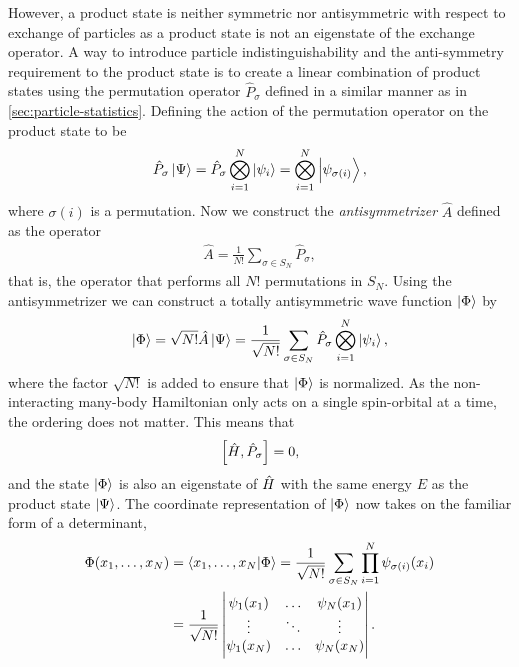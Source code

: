         However, a product state is neither symmetric nor antisymmetric with
        respect to exchange of particles as a product state is not an eigenstate
        of the exchange operator.
        A way to introduce particle indistinguishability and the anti-symmetry
        requirement to the product state is to create a linear combination of
        product states using the permutation operator $\hat{P}_{\sigma}$ defined
        in a similar manner as in \autoref{sec:particle-statistics}.
        Defining the action of the permutation operator on the product state to
        be
        \begin{align}
            \hat{P}_{\sigma}\ket{\Psi}
            = \hat{P}_{\sigma}\bigotimes_{i = 1}^{N}\ket{\psi_i}
            = \bigotimes_{i = 1}^{N}\ket{\psi_{\sigma(i)}},
        \end{align}
        where $\sigma(i)$ is a permutation.
        Now we construct the \emph{antisymmetrizer} $\hat{A}$ defined as the
        operator
        \begin{align}
            \hat{A} = \frac{1}{N!}\sum_{\sigma \in S_{N}}\hat{P}_{\sigma},
        \end{align}
        that is, the operator that performs all $N!$ permutations in $S_{N}$.
        Using the antisymmetrizer we can construct a totally antisymmetric wave
        function $\ket{\Phi}$ by
        \begin{align}
            \ket{\Phi}
            = \sqrt{N!}\hat{A}\ket{\Psi}
            = \frac{1}{\sqrt{N!}}\sum_{\sigma \in S_{N}}
            \hat{P}_{\sigma}
            \bigotimes_{i = 1}^{N}\ket{\psi_i},
            \label{eq:slater-determinant-abstract}
        \end{align}
        where the factor $\sqrt{N!}$ is added to ensure that $\ket{\Phi}$ is
        normalized.
        As the non-interacting many-body Hamiltonian only acts on a single
        spin-orbital at a time, the ordering does not matter.
        This means that
        \begin{align}
            \left[\hat{H}, \hat{P}_{\sigma}\right] = 0,
        \end{align}
        and the state $\ket{\Phi}$ is also an eigenstate of $\hat{H}$ with the
        same energy $E$ as the product state $\ket{\Psi}$.
        The coordinate representation of $\ket{\Phi}$ now takes on the familiar
        form of a determinant,
        \begin{align}
            \Phi(x_1, \dots, x_N)
            &=
            \braket{x_1, \dots, x_N}{\Phi}
            = \frac{1}{\sqrt{N!}}
            \sum_{\sigma \in S_{N}}
            \prod_{i = 1}^{N}
            \psi_{\sigma(i)}(x_i)
            \\
            &=
            \frac{1}{\sqrt{N!}}
            \begin{vmatrix}
                \psi_1(x_1) & \dots & \psi_N(x_1) \\
                \vdots & \ddots & \vdots \\
                \psi_1(x_N) & \dots & \psi_N(x_N)
            \end{vmatrix}.
            \label{eq:coord_slater}
        \end{align}
